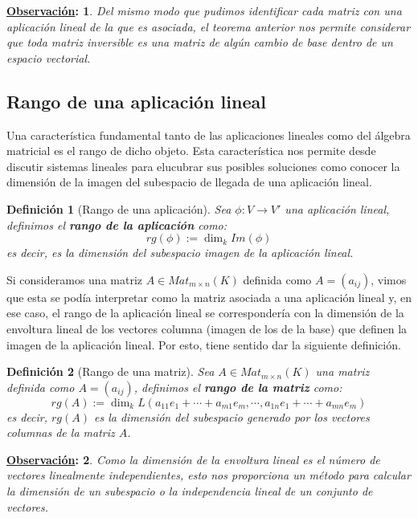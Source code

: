 \documentclass[10pt,a4paper,openright]{book}
\theoremstyle{break}
\newtheorem*{defi}{Definición}
\newtheorem*{obs}{\underline{Observación}:}
\begin{document}
\begin{obs}
Del mismo modo que pudimos identificar cada matriz con una aplicación lineal de la que es asociada, el teorema anterior nos permite considerar que toda matriz inversible es una matriz de algún cambio de base dentro de un espacio vectorial.
\end{obs}

\subsection{Rango de una aplicación lineal}
Una característica fundamental tanto de las aplicaciones lineales como del álgebra matricial es el rango de dicho objeto. Esta característica nos permite desde discutir sistemas lineales para elucubrar sus posibles soluciones como conocer la dimensión de la imagen del subespacio de llegada de una aplicación lineal.

\begin{defi}[Rango de una aplicación]
Sea $\phi: V\rightarrow V'$ una aplicación lineal, definimos el \textbf{rango de la aplicación} como:
$$
rg(\phi) := \dim_k Im(\phi)
$$
es decir, es la dimensión del subespacio imagen de la aplicación lineal.
\end{defi}

Si consideramos una matriz $A\in Mat_{m\times n}(K)$ definida como $A=(a_{ij})$, vimos que esta se podía interpretar como la matriz asociada a una aplicación lineal y, en ese caso, el rango de la aplicación lineal se correspondería con la dimensión de la envoltura lineal de los vectores columna (imagen de los de la base) que definen la imagen de la aplicación lineal. Por esto, tiene sentido dar la siguiente definición.

\begin{defi}[Rango de una matriz]
Sea $A\in Mat_{m\times n}(K)$ una matriz definida como $A=(a_{ij})$, definimos el \textbf{rango de la matriz} como: 
$$
rg(A) := \dim_k L(a_{11}e_{1}+\cdots+a_{m1}e_m, \cdots , a_{1n}e_1+\cdots+a_{mn}e_m)
$$
es decir, $rg(A)$ es la dimensión del subespacio generado por los vectores columnas de la matriz $A$.
\end{defi}

\begin{obs}
Como la dimensión de la envoltura lineal es el número de vectores linealmente independientes, esto nos proporciona un método para calcular la dimensión de un subespacio o la independencia lineal de un conjunto de vectores.
\end{obs}
\end{document}
